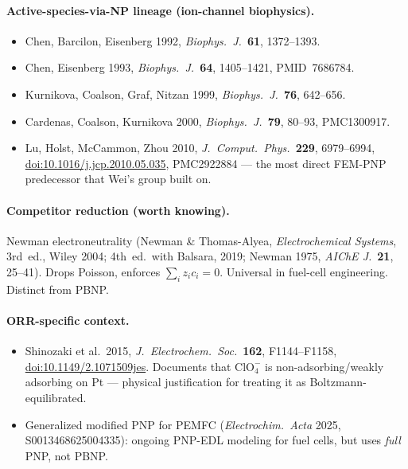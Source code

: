 \documentclass[11pt]{article}
\newcommand{\ClOf}{\mathrm{ClO}_4^{-}}
\begin{document}
\paragraph{Active-species-via-NP lineage (ion-channel biophysics).}
\begin{itemize}
\item Chen, Barcilon, Eisenberg 1992, \emph{Biophys.~J.}\ \textbf{61},
      1372--1393.
\item Chen, Eisenberg 1993, \emph{Biophys.~J.}\ \textbf{64}, 1405--1421,
      PMID~7686784.
\item Kurnikova, Coalson, Graf, Nitzan 1999, \emph{Biophys.~J.}\ \textbf{76},
      642--656.
\item Cardenas, Coalson, Kurnikova 2000, \emph{Biophys.~J.}\ \textbf{79},
      80--93, PMC1300917.
\item Lu, Holst, McCammon, Zhou 2010, \emph{J.~Comput.~Phys.}\ \textbf{229},
      6979--6994,
      \href{https://doi.org/10.1016/j.jcp.2010.05.035}{doi:10.1016/j.jcp.2010.05.035},
      PMC2922884 --- the most direct FEM-PNP predecessor that Wei's group
      built on.
\end{itemize}

\paragraph{Competitor reduction (worth knowing).}
Newman electroneutrality (Newman \& Thomas-Alyea, \emph{Electrochemical
Systems}, 3rd~ed., Wiley 2004; 4th~ed.\ with Balsara, 2019; Newman 1975,
\emph{AIChE J.}\ \textbf{21}, 25--41). Drops Poisson, enforces
$\sum_i z_i c_i=0$. Universal in fuel-cell engineering. Distinct from PBNP.

\paragraph{ORR-specific context.}
\begin{itemize}
\item Shinozaki et al.\ 2015, \emph{J.~Electrochem.~Soc.}\ \textbf{162},
      F1144--F1158,
      \href{https://doi.org/10.1149/2.1071509jes}{doi:10.1149/2.1071509jes}.
      Documents that $\ClOf$ is non-adsorbing/weakly adsorbing on Pt ---
      physical justification for treating it as Boltzmann-equilibrated.
\item Generalized modified PNP for PEMFC (\emph{Electrochim.~Acta} 2025,
      S0013468625004335): ongoing PNP-EDL modeling for fuel cells, but uses
      \emph{full} PNP, not PBNP.
\end{itemize}
\end{document}
